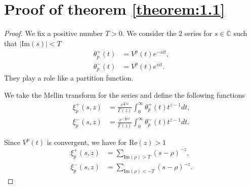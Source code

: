 \section{Proof of theorem \ref{theorem:1.1}}

\begin{proof}
We fix a positive number $T>0$.
We consider the 2 series for $s\in\mathbb{C}$ such that $|\mathrm{Im}(s)|<T$
\begin{equation*}
    \begin{split}
        \theta_{p}^{+}(t) &= V^{p}(t) e^{-sit}, \\
        \theta_{p}^{-}(t) &= V^{p}(t) e^{sit}.
    \end{split}
\end{equation*}
They play a role like a partition function.

We take the Mellin transform for the series and define the following functions
\begin{equation*}
    \begin{split}
        \xi_{p}^{+}(s,z) &= \frac{e^{\frac{\pi}{2}iz}}{\Gamma(z)} \int_{0}^{\infty}\theta_{p}^{+}(t)t^{z-1}dt,\\
        \xi_{p}^{-}(s,z) &= \frac{e^{-\frac{\pi}{2}iz}}{\Gamma(z)}  \int_{0}^{\infty}\theta_{p}^{-}(t)t^{z-1}dt.
    \end{split}
\end{equation*}

Since $V^{p}(t)$ is convergent, we have for $\mathrm{Re}(z) > 1$
\begin{equation*}
    \begin{split}
        \xi_{p}^{+}(s,z) &= \sum_{\mathrm{Im}(\rho)>T}(s-\rho)^{-z}, \\
        \xi_{p}^{-}(s,z) &= \sum_{\mathrm{Im}(\rho)<-T}(s-\rho)^{-z}.
    \end{split}
\end{equation*}


\end{proof}
